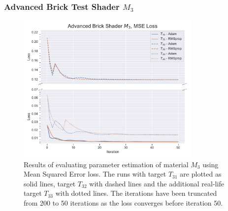 \subsubsection{Advanced Brick Test Shader $M_3$}
\begin{figure}
    \centering
    \includegraphics[width=0.8\textwidth]{img/evaluation/M3/ABS_MSE.pdf}
    \caption{Results of evaluating parameter estimation of material $M_3$ using Mean Squared Error loss. The runs with target $T_{31}$ are plotted as solid lines, target $T_{32}$ with dashed lines and the additional real-life target $T_{33}$ with dotted lines. The iterations have been truncated from 200 to 50 iterations as the loss converges before iteration 50.}
    \label{fig:M3MSEData}
\end{figure}

